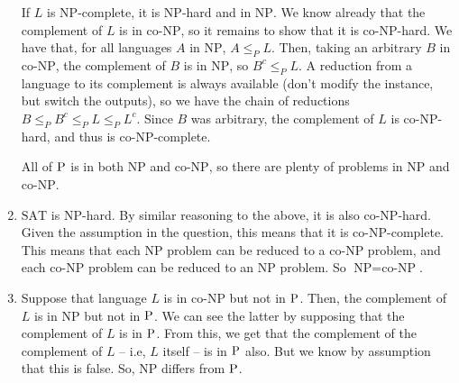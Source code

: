 \documentclass{article}
\begin{document}
\begin{enumerate}
    If $L$ is $\textrm{NP}$-complete, it is $\textrm{NP}$-hard and in $\textrm{NP}$. We know already that the complement of $L$ is in $\textrm{co-NP}$, so it remains to show that it is $\textrm{co-NP}$-hard. We have that, for all languages $A$ in $\textrm{NP}$, $A \leq_P L$. Then, taking an arbitrary $B$ in $\textrm{co-NP}$, the complement of $B$ is in $\textrm{NP}$, so $B^c \leq_P L$. A reduction from a language to its complement is always available (don't modify the instance, but switch the outputs), so we have the chain of reductions $B \leq_P B^c \leq_P L \leq_P L^c$. Since $B$ was arbitrary, the complement of $L$ is $\textrm{co-NP}$-hard, and thus is $\textrm{co-NP}$-complete.

    All of $\textrm P$ is in both $\textrm{NP}$ and $\textrm{co-NP}$, so there are plenty of problems in $\textrm{NP}$ and $\textrm{co-NP}$.
  \item $\textrm{SAT}$ is $\textrm{NP}$-hard. By similar reasoning to the above, it is also $\textrm{co-NP}$-hard. Given the assumption in the question, this means that it is $\textrm{co-NP}$-complete. This means that each $\textrm{NP}$ problem can be reduced to a $\textrm{co-NP}$ problem, and each $\textrm{co-NP}$ problem can be reduced to an $\textrm{NP}$ problem. So $\textrm{NP} = \textrm{co-NP}$.
  \item Suppose that language $L$ is in $\textrm{co-NP}$ but not in $\textrm P$. Then, the complement of $L$ is in $\textrm{NP}$ but not in $\textrm P$. We can see the latter by supposing that the complement of $L$ is in $\textrm P$. From this, we get that the complement of  the complement of $L$ -- i.e, $L$ itself -- is in $\textrm P$ also. But we know by assumption that this is false. So, $\textrm{NP}$ differs from $\textrm P$.
\end{enumerate}
\end{document}
